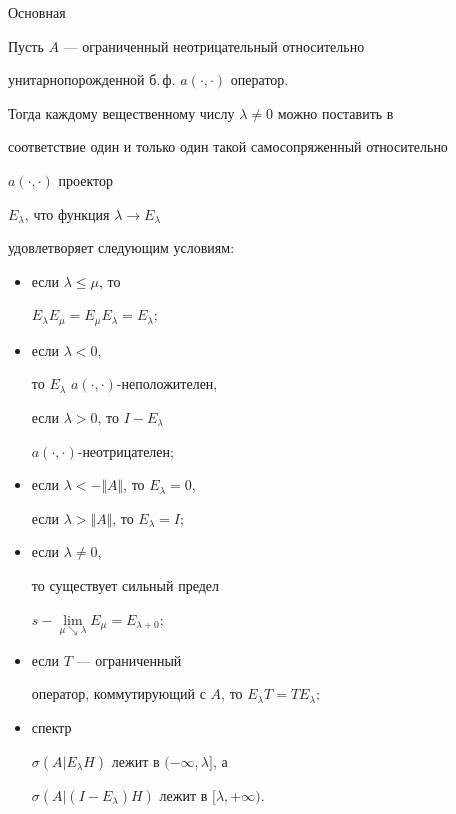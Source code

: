 Основная





\begin{thm}


Пусть $A$ --- ограниченный неотрицательный относительно


унитарнопорожденной б.\,ф. $a(\cdot,\cdot)$ оператор.


Тогда каждому вещественному числу $\lambda\ne 0$ можно поставить в


соответствие один и только один такой самосопряженный относительно


$a(\cdot,\cdot)$ проектор


$E_{\lambda}$, что функция $\lambda\to E_{\lambda}$


удовлетворяет следующим условиям\/$:$


\begin{itemize}


\item[1)] если $\lambda\leq \mu$, то


$E_{\lambda}E_{\mu}=E_{\mu}E_{\lambda}=E_{\lambda};$


\item[2)] если $\lambda <0$,


то $E_{\lambda}$\; $a(\cdot,\cdot)$-неположителен,


если $\lambda >0$, то $I-E_{\lambda}$\;


$a(\cdot,\cdot)$-неотрицателен\/$;$


\item[3)] если $\lambda <-\Vert A\Vert$, то $E_{\lambda}=0$,


если $\lambda >\Vert A\Vert$, то $E_{\lambda}=I;$


\item[4)] если $\lambda\ne 0$,


то существует сильный предел


$s-\lim\limits_{\mu\searrow\lambda}E_{\mu}=E_{\lambda +0};$


\item[5)] если $T$ --- ограниченный


оператор, коммутирующий с $A$, то $E_{\lambda}T=TE_{\lambda};$


\item[6)] спектр


$\sigma (A\vert E_{\lambda}H)$ лежит в $(-\infty,\lambda ]$, а


$\sigma (A|(I-E_{\lambda})H)$ лежит в $[\lambda,+\infty)$.



\end{itemize}
\end{thm}
